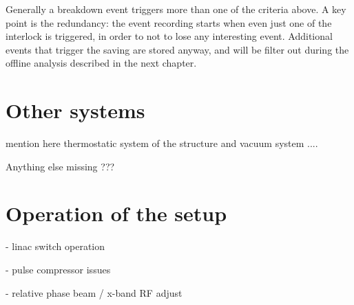 Generally a breakdown event triggers more than one of the criteria above. A key point is the redundancy: the event recording starts when even just one of the interlock is triggered, in order to not to lose any interesting event. Additional events that trigger the saving are stored anyway, and will be filter out during the offline analysis described in the next chapter.


\section[Other systems]{Other systems}
mention here thermostatic system of the structure and vacuum system ....

Anything else missing ???

\section[Operation of the setup]{Operation of the setup}

- linac switch operation

- pulse compressor issues

- relative phase beam / x-band RF adjust









